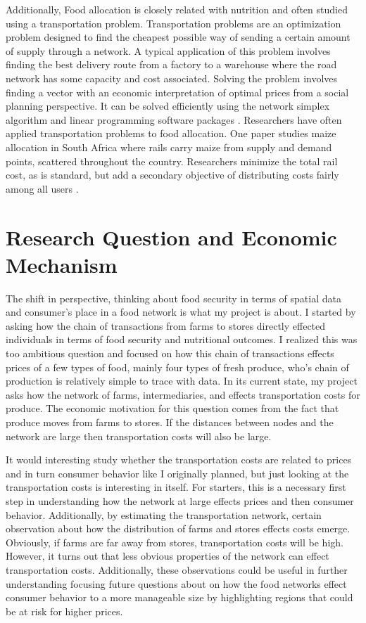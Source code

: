 \documentclass{report}
\begin{document}
Additionally, Food allocation is closely related with nutrition and often studied using a transportation problem. Transportation problems are an optimization problem designed to find the cheapest possible way of sending a certain amount of supply through a network. A typical application of this problem involves finding the best delivery route from a factory to a warehouse where the road network has some capacity and cost associated. Solving the problem involves finding a vector with an economic interpretation of optimal prices from a social planning perspective. It can be solved efficiently using the network simplex algorithm and linear programming software packages \cite{Cook}. Researchers have often applied transportation problems to food allocation. One paper studies maize allocation in South Africa where rails carry maize from supply and demand points, scattered throughout the country. Researchers minimize the total rail cost, as is standard, but add a secondary objective of distributing costs fairly among all users \cite{Stewart}.

\section{Research Question and Economic Mechanism}

The shift in perspective, thinking about food security in terms of spatial data and consumer's place in a food network is what my project is about. I started by asking how the chain of transactions from farms to stores directly effected individuals in terms of food security and nutritional outcomes. I realized this was too ambitious question and focused on how this chain of transactions effects prices of a few types of food, mainly four types of fresh produce, who's chain of production is relatively simple to trace with data. In its current state, my project asks how the network of farms, intermediaries, and effects transportation costs for produce. The economic motivation for this question comes from the fact that produce moves from farms to stores. If the distances between nodes and the network are large then transportation costs will also be large.

It would interesting study whether the transportation costs are related to prices and in turn consumer behavior like I originally planned, but just looking at the transportation costs is interesting in itself. For starters, this is a necessary first step in understanding how the network at large effects prices and then consumer behavior. Additionally, by estimating the transportation network, certain observation about how the distribution of farms and stores effects costs emerge. Obviously, if farms are far away from stores, transportation costs will be high. However, it turns out that less obvious properties of the network can effect transportation costs. Additionally, these observations could be useful in further understanding focusing future questions about on how the food networks effect consumer behavior to a more manageable size by highlighting regions that could be at risk for higher prices.
\end{document}
